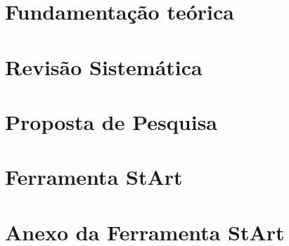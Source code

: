 \documentclass[12pt, oneside, a4paper]{ppgcc}
\begin{document}
\chapter{Fundamentação teórica}\label{cap:fundamentos} 



\chapter{Revisão Sistemática}\label{cap:revisao} 



\chapter{Proposta de Pesquisa}\label{cap:proposta} 



%

\newpage
\bibliografia
\renewcommand{\bibname}{\textbf{Refer\^encias}}




\clearpage{}
\appendix
\renewcommand{\chaptername}{Ap\^endice} %

\chapter{Ferramenta StArt}\label{cap:ferramentaStart}
\thispagestyle{empty}




\clearpage{}
\attachment
\renewcommand{\chaptername}{Anexo} %

\chapter{Anexo da Ferramenta StArt} \label{cap:anexo1}
\thispagestyle{empty}

\end{document}

